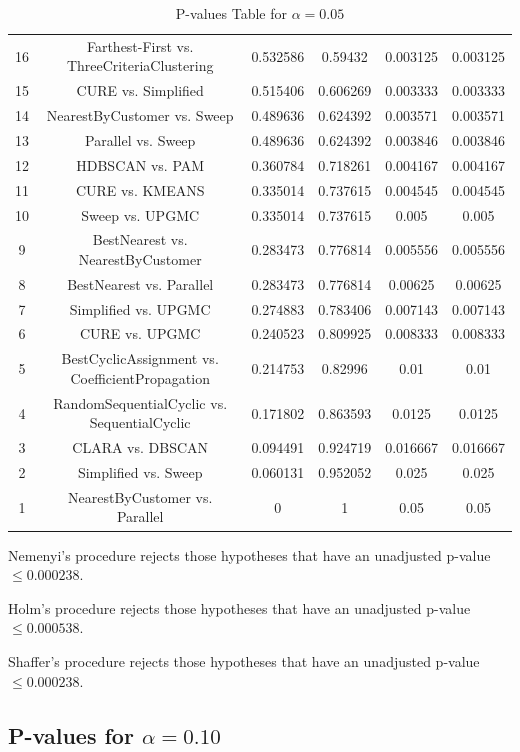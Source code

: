 \documentclass[a4paper,10pt]{article}
\begin{document}
\begin{landscape}
\begin{table}[!htp]
\begin{tabular}{cccccc}
16&Farthest-First vs. ThreeCriteriaClustering&0.532586&0.59432&0.003125&0.003125\\
15&CURE vs. Simplified&0.515406&0.606269&0.003333&0.003333\\
14&NearestByCustomer vs. Sweep&0.489636&0.624392&0.003571&0.003571\\
13&Parallel vs. Sweep&0.489636&0.624392&0.003846&0.003846\\
12&HDBSCAN vs. PAM&0.360784&0.718261&0.004167&0.004167\\
11&CURE vs. KMEANS&0.335014&0.737615&0.004545&0.004545\\
10&Sweep vs. UPGMC&0.335014&0.737615&0.005&0.005\\
9&BestNearest vs. NearestByCustomer&0.283473&0.776814&0.005556&0.005556\\
8&BestNearest vs. Parallel&0.283473&0.776814&0.00625&0.00625\\
7&Simplified vs. UPGMC&0.274883&0.783406&0.007143&0.007143\\
6&CURE vs. UPGMC&0.240523&0.809925&0.008333&0.008333\\
5&BestCyclicAssignment vs. CoefficientPropagation&0.214753&0.82996&0.01&0.01\\
4&RandomSequentialCyclic vs. SequentialCyclic&0.171802&0.863593&0.0125&0.0125\\
3&CLARA vs. DBSCAN&0.094491&0.924719&0.016667&0.016667\\
2&Simplified vs. Sweep&0.060131&0.952052&0.025&0.025\\
1&NearestByCustomer vs. Parallel&0&1&0.05&0.05\\
\hline
\end{tabular}
\caption{P-values Table for $\alpha=0.05$}
\end{table}Nemenyi's procedure rejects those hypotheses that have an unadjusted p-value $\le0.000238$.

Holm's procedure rejects those hypotheses that have an unadjusted p-value $\le0.000538$.

Shaffer's procedure rejects those hypotheses that have an unadjusted p-value $\le0.000238$.

\pagebreak

\subsection{P-values for $\alpha=0.10$}


\end{landscape}
\end{document}
